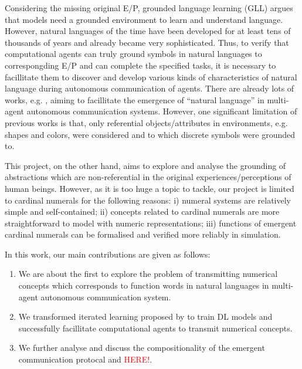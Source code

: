 \documentclass[msc,deptreport]{infthesis} %
\begin{document}
Considering the missing original E/P, grounded language learning (GLL) argues that models need a grounded environment to learn and understand language\cite{matuszek2018grounded}. However, natural languages of the time have been developed for at least tens of thousands of years\cite{berwick2016only} and already became very sophisticated. Thus, to verify that computational agents can truly ground symbols in natural languages to correspongding E/P and can complete the specified tasks, it is necessary to facillitate them to discover and develop various kinds of characteristics of natural language during autonomous communication of agents. There are already lots of works, e.g. \cite{hill2017understanding, havrylov2017emergence, yu2018interactive, kottur2017natural}, aiming to facillitate the emergence of ``natural language'' in multi-agent autonomous communication systems. However, one significant limitation of previous works is that, only referential objects/attributes in environments, e.g. shapes and colors, were considered and to which discrete symbols were grounded to.

This project, on the other hand, aims to explore and analyse the grounding of abstractions which are non-referential in the original experiences/perceptions of human beings. However, as it is too huge a topic to tackle, our project is limited to cardinal numerals for the following reasons: i) numeral systems are relatively simple and self-contained\cite{james1999numeral}; ii) concepts related to cardinal numerals are more straightforward to model with numeric representations; iii) functions of emergent cardinal numerals can be formalised and verified more reliably in simulation.

In this work, our main contributions are given as follows:

\begin{enumerate}
  \item We are about the first to explore the problem of transmitting numerical concepts which corresponds to function words in natural languages in multi-agent autonomous communication system.
  \item We transformed iterated learning proposed by \cite{smith2003iterated} to train DL models and successfully facillitate computational agents to transmit numerical concepts.
  \item We further analyse and discuss the compositionality of the emergent communication protocal and \textcolor{red}{HERE!}.
\end{enumerate}
\end{document}
